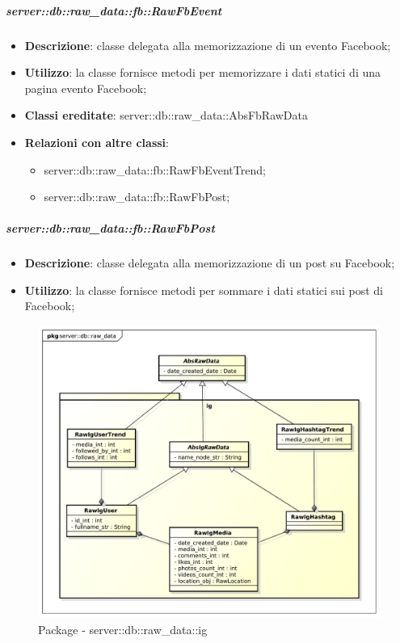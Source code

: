 		\subparagraph{server::db::raw\_data::fb::RawFbEvent} %
		\label{subp:server_db_raw_data_fb_rawfbevent}
			\begin{itemize}
				\item \textbf{Descrizione}: classe delegata alla memorizzazione di un evento Facebook;
				\item \textbf{Utilizzo}: la classe fornisce metodi per memorizzare i dati statici di una pagina evento Facebook;
				\item \textbf{Classi ereditate}: server::db::raw\_data::AbsFbRawData
				\item \textbf{Relazioni con altre classi}:
					\begin{itemize}
						\item server::db::raw\_data::fb::RawFbEventTrend;
						\item server::db::raw\_data::fb::RawFbPost;
					\end{itemize}
			\end{itemize}


		\subparagraph{server::db::raw\_data::fb::RawFbPost} %
		\label{subp:server_db_raw_data_fb_rawfbpost}
			\begin{itemize}
				\item \textbf{Descrizione}: classe delegata alla memorizzazione di un post su Facebook;
				\item \textbf{Utilizzo}: la classe fornisce metodi per sommare i dati statici sui post di Facebook;
			\end{itemize}




		\begin{figure}[htbp]
			\centering
			\centerline{\includegraphics[scale=0.5]{./images/server/raw_data_ig.pdf}}
			\caption{Package - server::db::raw\_data::ig}
		\end{figure}

